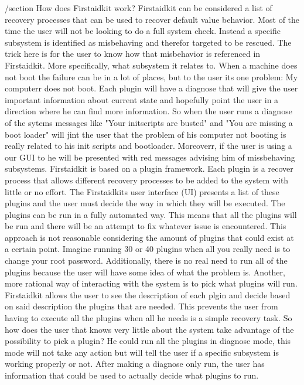 /section{ How does Firstaidkit work? }
Firstaidkit can be considered a list of recovery processes that can be used to recover default value behavior.  Most of the time the user will not be looking to do a full system check.  Instead a specific subsystem is identified as misbehaving and therefor targeted to be rescued.  The trick here is for the user to know how that misbehavior is referenced in Firstaidkit.  More specifically, what subsystem it relates to.  When a machine does not boot the failure can be in a lot of places, but to the user its one problem: My computerr does not boot.  Each plugin will have a diagnose that will give the user important information about current state and hopefully point the user in a direction where he can find more information.  So when the user runs a diagnose of the sytems messages like "Your initscripts are busted" and "You are missing a boot loader" will jint the user that the problem of his computer not booting is really related to his init scripts and bootloader.  Moreoverr, if the user is using a our GUI to he will be presented with red messages advising him of missbehaving subsystems.
Firstaidkit is based on a plugin framework.  Each plugin is a recover process that allows different recovery processes to be added to the system with little or no effort.  The Firstaidkits user interface (UI) presents a list of these plugins and the user must decide the way in which they will be executed.  The plugins can be run in a fully automated way.  This means that all the plugins will be run and there will be an attempt to fix whatever issue is encountered.  This approach is not reasonable considering the amount of plugins that could exist at a certain point.  Imagine running 30 or 40 plugins when all you really need is to change your root password.  Additionally, there is no real need to run all of the plugins because the user will have some idea of what the problem is.
Another, more rational way of interacting with the system is to pick what plugins will run.  Firstaidkit allows the user to see the description of each plgin and decide based on said description the plugins that are needed.  This prevents the user from having to execute all the plugins when all he needs is a simple recovery task.
So how does the user that knows very little about the system take advantage of the possibility to pick a plugin?  He could run all the plugins in diagnose mode, this mode will not take any action but will tell the user if a specific subsystem is working properly or not.  After making a diagnose only run, the user has information that could be used to actually decide what plugins to run.
